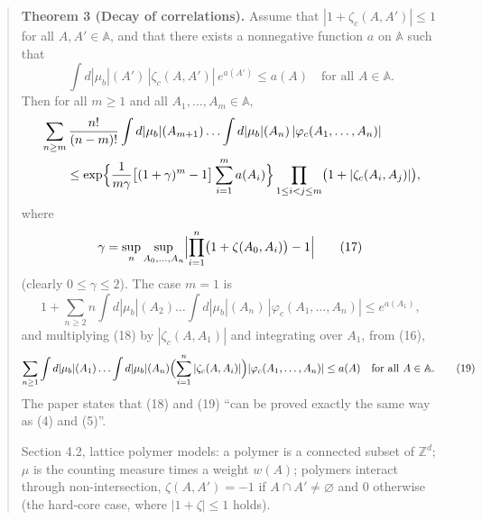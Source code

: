 \begin{quote}
\textbf{Theorem 3 (Decay of correlations).} Assume that
$|1+\zeta_c(A,A')|\le1$ for all $A,A'\in\mathbb A$, and that there exists a
nonnegative function $a$ on $\mathbb A$ such that
\begin{equation*}
 \int d|\mu_b|(A')\,|\zeta_c(A,A')|\,e^{a(A')}\le a(A)\quad
 \text{for all }A\in\mathbb A.\tag{16}
\end{equation*}
Then for all $m\ge1$ and all $A_1,\ldots,A_m\in\mathbb A$,
\begin{align*}
 &\sum_{n\ge m}\frac{n!}{(n-m)!}\int d|\mu_b|(A_{m+1})\ldots\int d|\mu_b|(A_n)\,
 |\varphi_c(A_1,\ldots,A_n)|\\
 &\qquad\le\exp\Bigl\{\frac1{m\gamma}\bigl[(1+\gamma)^m-1\bigr]
 \sum_{i=1}^ma(A_i)\Bigr\}\prod_{1\le i<j\le m}\bigl(1+|\zeta_c(A_i,A_j)|\bigr),
\end{align*}
where
\begin{equation*}
 \gamma=\sup_n\sup_{A_0,\ldots,A_n}\Bigl|\prod_{i=1}^n\bigl(1+\zeta(A_0,A_i)\bigr)-1\Bigr|
 \tag{17}
\end{equation*}
(clearly $0\le\gamma\le2$). The case $m=1$ is
\begin{equation*}
 1+\sum_{n\ge2}n\int d|\mu_b|(A_2)\ldots\int d|\mu_b|(A_n)\,
 |\varphi_c(A_1,\ldots,A_n)|\le e^{a(A_1)},\tag{18}
\end{equation*}
and multiplying (18) by $|\zeta_c(A,A_1)|$ and integrating over $A_1$, from
(16),
\begin{equation*}
 \sum_{n\ge1}\int d|\mu_b|(A_1)\ldots\int d|\mu_b|(A_n)\Bigl(\sum_{i=1}^n
 |\zeta_c(A,A_i)|\Bigr)|\varphi_c(A_1,\ldots,A_n)|\le a(A)\quad
 \text{for all }A\in\mathbb A.\tag{19}
\end{equation*}
The paper states that (18) and (19) ``can be proved exactly the same way as
(4) and (5)''.

Section 4.2, lattice polymer models: a polymer is a connected subset of
$\mathbb Z^d$; $\mu$ is the counting measure times a weight $w(A)$; polymers
interact through non-intersection, $\zeta(A,A')=-1$ if $A\cap A'\ne\varnothing$
and $0$ otherwise (the hard-core case, where $|1+\zeta|\le1$ holds).
\end{quote}

